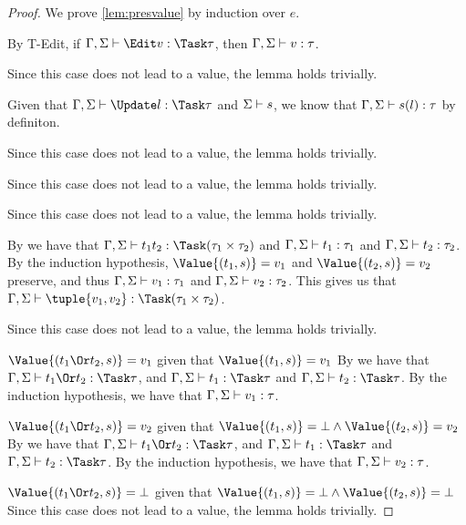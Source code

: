 \begin{proof}
  We prove \cref{lem:presvalue} by induction over $e$.

      {By T-Edit, if $\Gamma,\Sigma\infers \Edit v:\Task\tau$, then $\Gamma,\Sigma\vdash v:\tau$.}

      {Since this case does not lead to a value, the lemma holds trivially.}

      {Given that $\Gamma,\Sigma\infers\Update l:\Task \tau$ and $\Sigma\vdash s$,
      we know that $\Gamma,\Sigma\vdash s(l):\tau$ by definiton.}

      {Since this case does not lead to a value, the lemma holds trivially.}

      { Since this case does not lead to a value, the lemma holds trivially.}

      {Since this case does not lead to a value, the lemma holds trivially.}

      {By  we have that $\Gamma,\Sigma\infers t_1\And t_2:\Task(\tau_1\times\tau_2)$ and $\Gamma,\Sigma\vdash t_1:\tau_1$ and $\Gamma,\Sigma\vdash t_2:\tau_2$.
      By the induction hypothesis, $ \Value{(t_1,s)}=v_1$ and $\Value{(t_2,s)}=v_2$ preserve, and thus $\Gamma,\Sigma\vdash v_1:\tau_1$ and $\Gamma,\Sigma\vdash v_2:\tau_2$.
      This gives us that $\Gamma,\Sigma\infers \tuple{v_1, v_2}:\Task(\tau_1\times\tau_2)$.}

      { Since this case does not lead to a value, the lemma holds trivially.}

\case
{$\Value{(t_1\Or t_2,s)}=v_1$ given that
  $\Value{(t_1,s)}=v_1$}{
  By  we have that $\Gamma,\Sigma\infers t_1\Or t_2:\Task\tau$,
  and $\Gamma,\Sigma\infers t_1:\Task\tau$ and
  $\Gamma,\Sigma\infers t_2:\Task\tau$. By the induction hypothesis, we have
  that $\Gamma,\Sigma\vdash v_1:\tau$.}

\case
{$\Value{(t_1\Or t_2,s)}=v_2$ given that
  $\Value{(t_1,s)}=\bot\wedge\Value{(t_2,s)}=v_2$}{
  By  we have that $\Gamma,\Sigma\infers t_1\Or t_2:\Task\tau$,
  and $\Gamma,\Sigma\infers t_1:\Task\tau$ and
  $\Gamma,\Sigma\infers t_2:\Task\tau$. By the induction hypothesis, we have
  that $\Gamma,\Sigma\vdash v_2:\tau$.}

\case
{$\Value{(t_1\Or t_2,s)}=\bot$ given that
  $\Value{(t_1,s)}=\bot\wedge\Value{(t_2,s)}=\bot$}{ Since this case does not
  lead to a value, the lemma holds trivially.}


\end{proof}



